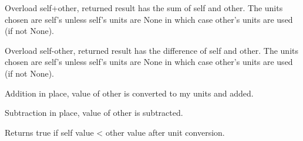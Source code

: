 \documentclass[letterpaper,10pt,english]{sphinxmanual}
\begin{document}
\begin{fulllineitems}
\begin{fulllineitems}
\label{\detokenize{ref/util/plot/Coord:TotalDepth.util.plot.Coord.Dim.__add__}}
Overload self+other, returned result has the sum of self and other.
The units chosen are self’s unless self’s units are None in which case other’s
units are used (if not None).

\end{fulllineitems}


\begin{fulllineitems}
\label{\detokenize{ref/util/plot/Coord:TotalDepth.util.plot.Coord.Dim.__sub__}}
Overload self-other, returned result has the difference of self and
other. The units chosen are self’s unless self’s units are None in
which case other’s units are used (if not None).

\end{fulllineitems}


\begin{fulllineitems}
\label{\detokenize{ref/util/plot/Coord:TotalDepth.util.plot.Coord.Dim.__iadd__}}
Addition in place, value of other is converted to my units and added.

\end{fulllineitems}


\begin{fulllineitems}
\label{\detokenize{ref/util/plot/Coord:TotalDepth.util.plot.Coord.Dim.__isub__}}
Subtraction in place, value of other is subtracted.

\end{fulllineitems}


\begin{fulllineitems}
\label{\detokenize{ref/util/plot/Coord:TotalDepth.util.plot.Coord.Dim.__lt__}}
Returns true if self value \textless{} other value after unit conversion.


\end{fulllineitems}
\end{fulllineitems}
\end{document}
